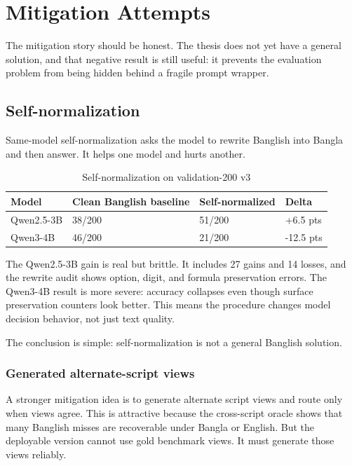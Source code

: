\chapter{Mitigation Attempts}

The mitigation story should be honest. The thesis does not yet have a general solution, and that negative result is still useful: it prevents the evaluation problem from being hidden behind a fragile prompt wrapper.

\section{Self-normalization}

Same-model self-normalization asks the model to rewrite Banglish into Bangla and then answer. It helps one model and hurts another.

\begin{table}[H]
\centering
\caption{Self-normalization on validation-200 v3}
\label{tab:selfnorm}
\small
\begin{tabular}{llll}
\hline
Model & Clean Banglish baseline & Self-normalized & Delta \\
\hline
Qwen2.5-3B & 38/200 & 51/200 & +6.5 pts \\
Qwen3-4B & 46/200 & 21/200 & -12.5 pts \\
\hline
\end{tabular}%
\end{table}

The Qwen2.5-3B gain is real but brittle. It includes 27 gains and 14 losses, and the rewrite audit shows option, digit, and formula preservation errors. The Qwen3-4B result is more severe: accuracy collapses even though surface preservation counters look better. This means the procedure changes model decision behavior, not just text quality.

The conclusion is simple: self-normalization is not a general Banglish solution.

\subsection{Generated alternate-script views}

A stronger mitigation idea is to generate alternate script views and route only when views agree. This is attractive because the cross-script oracle shows that many Banglish misses are recoverable under Bangla or English. But the deployable version cannot use gold benchmark views. It must generate those views reliably.

